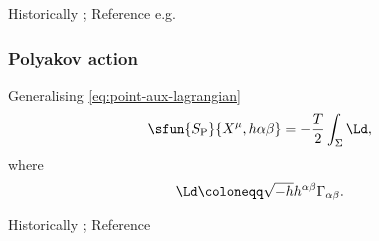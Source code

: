 \documentclass[a4paper,11pt]{article}
\begin{document}
Historically \cite{Nambu1970,Goto1971}; Reference e.g.\ 
\cite{Blumenhagen2013}
\cite[sec.\ 3.2]{Kiefer2012}

\subsubsection*{Polyakov action}

Generalising \eqref{eq:point-aux-lagrangian}
\begin{equation}
\sfun{S_\text{P}}{X^\mu, h{\alpha\beta}} = -\frac{T}{2}\int_\Sigma \Ld,
\end{equation}
where
\begin{equation}
\Ld \coloneqq \sqrt{-h} h^{\alpha\beta}\Gamma_{\alpha\beta}.
\end{equation}



Historically \cite{Brink1976,Deser1976,Polyakov1981};
Reference
\cite[sec.\ 3.2]{Kiefer2012}





\printbibliography
\end{document}
